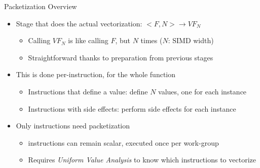 
\begin{frame}{Packetization Overview}

\begin{itemize}
    \item Stage that does the actual vectorization: $<F, N> \rightarrow VF_N$
    \begin{itemize}
        \item Calling $VF_N$ is like calling $F$, but $N$ times ($N$: SIMD width)
        \item Straightforward thanks to preparation from previous stages
    \end{itemize}
    
    \item This is done per-instruction, for the whole function
    \begin{itemize}
        \item Instructions that define a value: define $N$ values, one for each instance
        \item Instructions with side effects: perform side effects for each instance
    \end{itemize}
    
    \item Only  instructions need packetization
    \begin{itemize}
        \item {} instructions can remain scalar, executed once per work-group
        \item Requires \emph{Uniform Value Analysis} to know which instructions to vectorize
    \end{itemize}
    
\end{itemize}


\end{frame}


